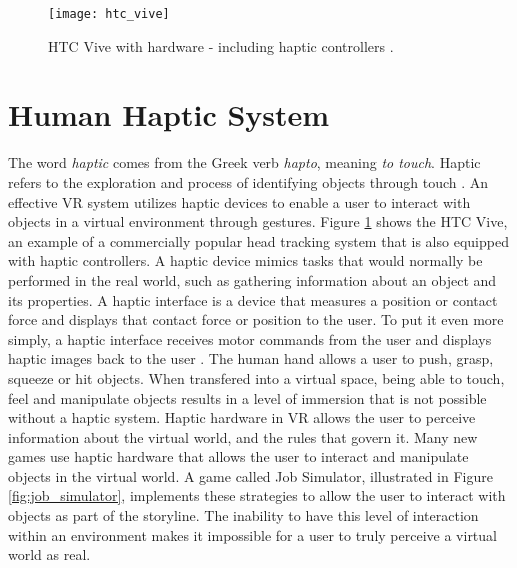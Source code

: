  \begin{figure}[h]
 	\centering
 	\texttt{[image: htc\_vive]}
 	\caption{HTC Vive with hardware - including haptic controllers \cite{walton_psvr_2016}.}
 	\label{fig:vive}
 \end{figure}


 
 
 

\section{Human Haptic System} \label{touch}




The word \textit{haptic} comes from the Greek verb \textit{hapto}, meaning \textit{to touch}. %
Haptic refers to the exploration and process of identifying objects through touch \cite{mihelj_haptics}. %
An effective VR system utilizes haptic devices to enable a user to interact with objects in a virtual environment through gestures. Figure \ref{fig:vive} shows the HTC Vive, an example of a commercially popular head tracking system that is also equipped with haptic controllers. A haptic device mimics tasks that would normally be performed in the real world, such as gathering information about an object and its properties. A haptic interface is a device that measures a position or contact force and displays that contact force or position to the user. To put it even more simply, a haptic interface receives motor commands from the user and displays haptic images back to the user \cite{mihelj_haptics}. The human hand allows a user to push, grasp, squeeze or hit objects. When transfered into a virtual space, being able to touch, feel and manipulate objects results in a level of immersion that is not possible without a haptic system. Haptic hardware in VR allows the user to perceive information about the virtual world, and the rules that govern it. Many new games use haptic hardware that allows the user to interact and manipulate objects in the virtual world. A game called Job Simulator, illustrated in Figure \ref{fig:job_simulator}, implements these strategies to allow the user to interact with objects as part of the storyline. The inability to have this level of interaction within an environment makes it impossible for a user to truly perceive a virtual world as real. 


